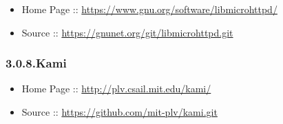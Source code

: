 \documentclass[12pt,twoside]{article}
\begin{document}
\begin{itemize}[noitemsep,topsep=\mdcompacttopsep]%

\item{}Home Page :: \href{https://www.gnu.org/software/libmicrohttpd/}{{\ttfamily https://\hspace{0pt}www.\hspace{0pt}gnu.\hspace{0pt}org/\hspace{0pt}software/\hspace{0pt}libmicrohttpd/\hspace{0pt}}}%

\item{}Source :: \href{https://gnunet.org/git/libmicrohttpd.git}{{\ttfamily https://\hspace{0pt}gnunet.\hspace{0pt}org/\hspace{0pt}git/\hspace{0pt}libmicrohttpd.\hspace{0pt}git}}%
\end{itemize}%

\subsubsection{3.0.8.\hspace*{0.5em}Kami}\label{sec-kami}%

\begin{itemize}[noitemsep,topsep=\mdcompacttopsep]%

\item{}Home Page :: \href{http://plv.csail.mit.edu/kami/}{{\ttfamily http://\hspace{0pt}plv.\hspace{0pt}csail.\hspace{0pt}mit.\hspace{0pt}edu/\hspace{0pt}kami/\hspace{0pt}}}%

\item{}Source :: \href{https://github.com/mit-plv/kami.git}{{\ttfamily https://\hspace{0pt}github.\hspace{0pt}com/\hspace{0pt}mit-\hspace{0pt}plv/\hspace{0pt}kami.\hspace{0pt}git}}%
\end{itemize}%
\end{document}
